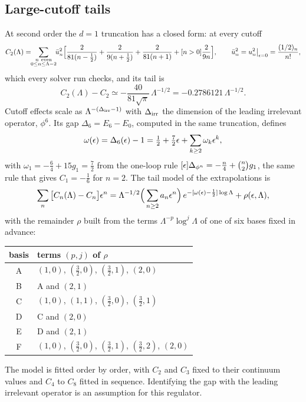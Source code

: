 \subsection{Large-cutoff tails}\label{htp:sec:tails}
At second order the $d=1$ truncation has a closed form: at every cutoff
\begin{equation}
 C_2(\Lambda)=\!\!\sum_{\substack{n\ {\rm even}\\0\le n\le\Lambda-2}}\!\!\bar u_n^2\Big[\frac{2}{81(n-\frac12)}+\frac{2}{9(n+\frac12)}
 +\frac{2}{81(n+1)}+[n>0]\frac{2}{9n}\Big],\qquad \bar u_n^2=u_n^2\big|_{\epsilon=0}=\frac{(1/2)_n}{n!},
 \label{htp:eq:C2shell}
\end{equation}
which every solver run checks, and its tail is
\begin{equation}
 C_2(\Lambda)-C_2\simeq-\frac{40}{81\sqrt\pi}\,\Lambda^{-1/2}=-0.2786121\,\Lambda^{-1/2} .
 \label{htp:eq:T2}
\end{equation}
Cutoff effects scale as $\Lambda^{-(\Delta_{\rm irr}-1)}$ with $\Delta_{\rm irr}$ the dimension of the leading
irrelevant operator, $\phi^6$. Its gap $\Delta_6=E_6-E_0$, computed in the same truncation, defines
\begin{equation}
 \omega(\epsilon)=\Delta_6(\epsilon)-1=\tfrac12+\tfrac72\epsilon+\sum_{k\ge2}\omega_k\epsilon^k,
 \label{htp:eq:omega}
\end{equation}
with $\omega_1=-\tfrac64+15g_1=\tfrac72$ from the one-loop rule $[\epsilon]\Delta_{\phi^n}=-\tfrac n4+\binom n2g_1$, the same
rule that gives $C_1=-\tfrac16$ for $n=2$. The tail model of the extrapolations is
\begin{equation}
 \sum_n\big[C_n(\Lambda)-C_n\big]\epsilon^n=\Lambda^{-1/2}\Big(\sum_{n\ge2}a_n\epsilon^n\Big)\,e^{-[\omega(\epsilon)-\frac12]\log\Lambda}
 +\rho(\epsilon,\Lambda),
 \label{htp:eq:tail}
\end{equation}
with the remainder $\rho$ built from the terms $\Lambda^{-p}\log^j\Lambda$ of one of six bases fixed in advance:
\begin{center}\footnotesize
\begin{tabular}{@{}cl@{}}
\toprule
basis & terms $(p,j)$ of $\rho$ \\
\midrule
A & $(1,0)$, $(\tfrac32,0)$, $(\tfrac32,1)$, $(2,0)$ \\
B & A and $(2,1)$ \\
C & $(1,0)$, $(1,1)$, $(\tfrac32,0)$, $(\tfrac32,1)$ \\
D & C and $(2,0)$ \\
E & D and $(2,1)$ \\
F & $(1,0)$, $(\tfrac32,0)$, $(\tfrac32,1)$, $(\tfrac32,2)$, $(2,0)$ \\
\bottomrule
\end{tabular}
\end{center}
The model is fitted order by order, with $C_2$ and $C_3$ fixed to their continuum values and $C_4$ to $C_8$ fitted in
sequence. Identifying the gap with the leading irrelevant operator is an assumption for this regulator.

